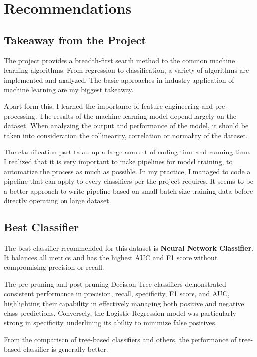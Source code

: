 \section{Recommendations}

\subsection{Takeaway from the Project}

The project provides a breadth-first search method to the common machine learning algorithms. From regression to classification, a variety of algorithms are implemented and analyzed. The basic approaches in industry application of machine learning are my biggest takeaway.

Apart form this, I learned the importance of feature engineering and pre-processing. The results of the machine learning model depend largely on the dataset. When analyzing the output and performance of the model, it should be taken into consideration the collinearity, correlation or normality of the dataset.

The classification part takes up a large amount of coding time and running time. I realized that it is very important to make pipelines for model training, to automatize the process as much as possible. In my practice, I managed to code a pipeline that can apply to every classifiers per the project requires. It seems to be a better approach to write pipeline based on small batch size training data before directly operating on large dataset.

\subsection{Best Classifier}

The best classifier recommended for this dataset is \textbf{Neural Network Classifier}. It balances all metrics and has the highest AUC and F1 score without compromising precision or recall. 

The pre-pruning and post-pruning Decision Tree classifiers demonstrated consistent performance in precision, recall, specificity, F1 score, and AUC, highlighting their capability in effectively managing both positive and negative class predictions. Conversely, the Logistic Regression model was particularly strong in specificity, underlining its ability to minimize false positives.

From the comparison of tree-based classifiers and others, the performance of tree-based classifier is generally better.

